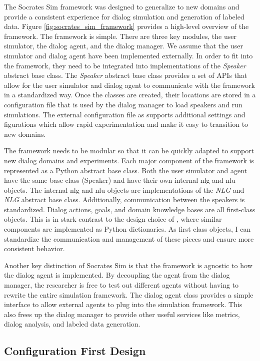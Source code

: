 The Socrates Sim framework was designed to generalize to new domains and provide a consistent experience for dialog simulation and generation of labeled data. Figure \ref{fig:socrates_sim_framework} provides a high-level overview of the framework. The framework is simple. There are three key modules, the user simulator, the dialog agent, and the dialog manager. We assume that the user simulator and dialog agent have been implemented externally. In order to fit into the framework, they need to be integrated into implementations of the \textit{Speaker} abstract base class. The \textit{Speaker} abstract base class provides a set of APIs that allow for the user simulator and dialog agent to communicate with the framework in a standardized way. Once the classes are created, their locations are stored in a configuration file that is used by the dialog manager to load speakers and run simulations. The external configuration file as supports additional settings and figurations which allow rapid experimentation and make it easy to transition to new domains.

The framework needs to be modular so that it can be quickly adapted to support new dialog domains and experiments. Each major component of the framework is represented as a Python abstract base class. Both the user simulator and agent have the same base class (Speaker) and have their own internal nlg and nlu objects. The internal nlg and nlu objects are implementations of the \textit{NLG} and \textit{NLG} abstract base class. Additionally, communication between the speakers is standardized. Dialog actions, goals, and domain knowledge bases are all first-class objects. This is in stark contrast to the design choice of \cite{li_end_to_end}, where similar components are implemented as Python dictionaries. As first class objects, I can standardize the communication and management of these pieces and ensure more consistent behavior.

Another key distinction of Socrates Sim is that the framework is agnostic to how the dialog agent is implemented. By decoupling the agent from the dialog manager, the researcher is free to test out different agents without having to rewrite the entire simulation framework.  The dialog agent class provides a simple interface to allow external agents to plug into the simulation framework. This also frees up the dialog manager to provide other useful services like metrics, dialog analysis, and labeled data generation.

\subsection{Configuration First Design} 

